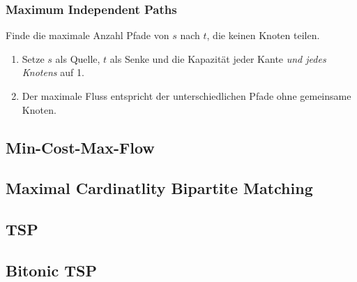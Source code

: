 \subsubsection{Maximum Independent Paths}
Finde die maximale Anzahl Pfade von $s$ nach $t$, die keinen Knoten teilen.
\begin{enumerate}
	\item Setze $s$ als Quelle, $t$ als Senke und die Kapazität jeder Kante \emph{und jedes Knotens} auf 1.
	\item Der maximale Fluss entspricht der unterschiedlichen Pfade ohne gemeinsame Knoten.
\end{enumerate}

\subsection{Min-Cost-Max-Flow}


\subsection{Maximal Cardinatlity Bipartite Matching}\label{kuhn}


\subsection{TSP}


\subsection{Bitonic TSP}


